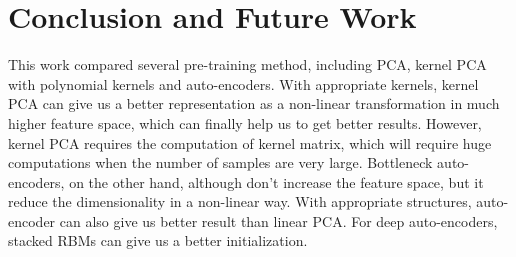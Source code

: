 \documentclass[tikz, multi,dvipsnames,svgnames,x11names]{article}
\begin{document}
%
%

\section{Conclusion and Future Work}
\label{sec:conclusion}

This work compared several pre-training method, including PCA, kernel PCA with polynomial kernels and auto-encoders. With appropriate kernels, kernel PCA can give us a better representation as a non-linear transformation in much higher feature space, which can finally help us to get better results. However, kernel PCA requires the computation of kernel matrix, which will require huge computations when the number of samples are very large. Bottleneck auto-encoders, on the other hand, although don't increase the feature space, but it reduce the dimensionality in a non-linear way. With appropriate structures, auto-encoder can also give us better result than linear PCA. For deep auto-encoders, stacked RBMs can give us a better initialization.
\end{document}
